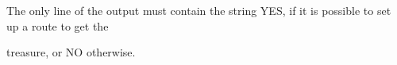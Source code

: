The only line of the output must contain the string YES, if it is possible to set up a route to get the

treasure, or NO otherwise.
